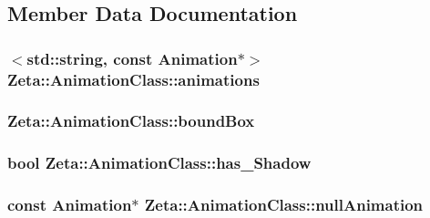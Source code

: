 \subsection{Member Data Documentation}
\hypertarget{classZeta_1_1AnimationClass_a8b61708081d2967f65f4d3a34048dd36}{
\subsubsection[{animations}]{$<$std\+::string, const {\bf Animation}$\ast$$>$ Zeta\+::\+Animation\+Class\+::animations\hspace{0.3cm}{\ttfamily [protected]}}}\label{classZeta_1_1AnimationClass_a8b61708081d2967f65f4d3a34048dd36}
\hypertarget{classZeta_1_1AnimationClass_a4e11683656c6f0648464c5b9b4e630c4}{
\subsubsection[{bound\+Box}]{ Zeta\+::\+Animation\+Class\+::bound\+Box\hspace{0.3cm}{\ttfamily [protected]}}}\label{classZeta_1_1AnimationClass_a4e11683656c6f0648464c5b9b4e630c4}
\hypertarget{classZeta_1_1AnimationClass_a24192e217829955ac2f97a940be58922}{
\subsubsection[{has\+\_\+\+Shadow}]{\setlength{\rightskip}{0pt plus 5cm}bool Zeta\+::\+Animation\+Class\+::has\+\_\+\+Shadow\hspace{0.3cm}{\ttfamily [protected]}}}\label{classZeta_1_1AnimationClass_a24192e217829955ac2f97a940be58922}
\hypertarget{classZeta_1_1AnimationClass_aa74a96c176531b81900c8568f77f966c}{
\subsubsection[{null\+Animation}]{\setlength{\rightskip}{0pt plus 5cm}const {\bf Animation}$\ast$ Zeta\+::\+Animation\+Class\+::null\+Animation\hspace{0.3cm}{\ttfamily [protected]}}}\label{classZeta_1_1AnimationClass_aa74a96c176531b81900c8568f77f966c}

